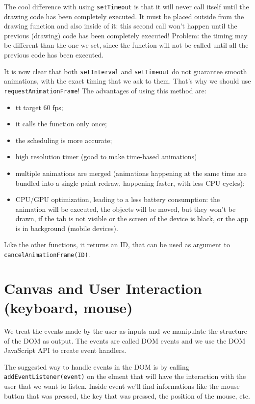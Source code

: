 \documentclass[a4paper,11pt]{book}
\begin{document}
The cool difference with using \texttt{setTimeout} is that it will never call itself until the
drawing code has been completely executed. It must be placed outside from the drawing function
and also inside of it: this second call won't happen until the previous (drawing) code
has been completely executed! Problem: the timing may be different than the one we set, since
the function will not be called until all the previous code has been executed.

It is now clear that both \texttt{setInterval} and \texttt{setTimeout} do not guarantee smooth
animations, with the exact timing that we ask to them. That's why we should use
\texttt{requestAnimationFrame}! The advantages of using this method are:
\begin{itemize}
\item tt target 60 fps;
\item it calls the function only once;
\item the scheduling is more accurate;
\item high resolution timer (good to make time-based animations)
\item multiple animations are merged (animations happening at the same time are bundled into
		a single paint redraw, happening faster, with less CPU cycles);
\item CPU/GPU optimization, leading to a less battery consumption: the animation will be
		executed, the objects will be moved, but they won't be drawn, if the tab is not
		visible or the screen of the device is black, or the app is in background (mobile
		devices).
\end{itemize}
Like the other functions, it returns an ID, that can be used as argument to
\texttt{cancelAnimationFrame(ID)}.

\section{Canvas and User Interaction (keyboard, mouse)}
We treat the events made by the user as inputs and we manipulate the structure of the DOM
as output.
The events are called DOM events and we use the DOM JavaScript API to create event handlers.

The suggested way to handle events in the DOM is by calling
\texttt{addEventListener(event)} on the elment that will have the interaction with
the user that we want to listen. Inside event we'll find informations like the
mouse button that was pressed, the key that was pressed, the position of the mouse, etc.
\end{document}
